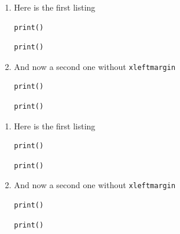 \documentclass[a4paper,11pt]{article}
\makeatletter
\let\@makecaption@ORI\@makecaption
\let\lst@MakeCaption@ORI\lst@MakeCaption
\let\@makecaption@CAPTION\@makecaption
\let\lst@MakeCaption@CAPTION\lst@MakeCaption}
\newcommand\Original{\let\@makecaption\@makecaption@ORI\let\lst@MakeCaption\lst@MakeCaption@ORI}
\newcommand\Caption{\let\@makecaption\@makecaption@CAPTION\let\lst@MakeCaption\lst@MakeCaption@CAPTION}
\makeatother
\begin{document}
\Original

\begin{enumerate}
\item Here is the first listing
\begin{lstlisting}[xleftmargin=30pt,resetmargins=true,caption=Some caption,captionpos=t]
print()
\end{lstlisting}
\begin{lstlisting}[xleftmargin=30pt,resetmargins=true,caption=Some caption,captionpos=b]
print()
\end{lstlisting}

\item And now a second one without \texttt{xleftmargin}
\begin{lstlisting}[xleftmargin=0pt,resetmargins=true,caption=Some caption,captionpos=t]
print()
\end{lstlisting}
\begin{lstlisting}[xleftmargin=0pt,resetmargins=true,caption=Some caption,captionpos=b]
print()
\end{lstlisting}
\end{enumerate}

\Caption\captionsetup{box=none}

\begin{enumerate}
\item Here is the first listing
\begin{lstlisting}[xleftmargin=30pt,resetmargins=true,caption=Some caption,captionpos=t]
print()
\end{lstlisting}
\begin{lstlisting}[xleftmargin=30pt,resetmargins=true,caption=Some caption,captionpos=b]
print()
\end{lstlisting}

\item And now a second one without \texttt{xleftmargin}
\begin{lstlisting}[xleftmargin=0pt,resetmargins=true,caption=Some caption,captionpos=t]
print()
\end{lstlisting}
\begin{lstlisting}[xleftmargin=0pt,resetmargins=true,caption=Some caption,captionpos=b]
print()
\end{lstlisting}
\end{enumerate}

\captionsetup{box=colorbox,boxcolor=orange!20}
\end{document}
